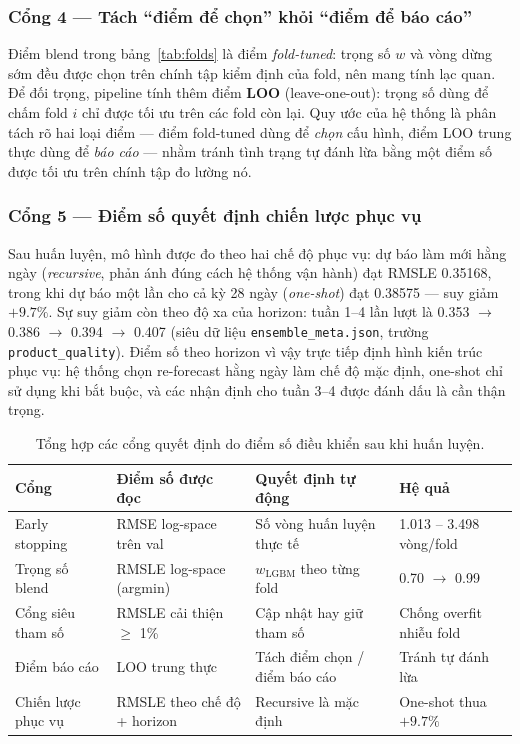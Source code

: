 \documentclass[12pt,a4paper]{report}
\begin{document}
\subsubsection{Cổng 4 --- Tách ``điểm để chọn'' khỏi ``điểm để báo cáo''}
Điểm blend trong bảng~\ref{tab:folds} là điểm \emph{fold-tuned}: trọng số $w$ và vòng
dừng sớm đều được chọn trên chính tập kiểm định của fold, nên mang tính lạc quan. Để
đối trọng, pipeline tính thêm điểm \textbf{LOO} (leave-one-out): trọng số dùng để chấm
fold $i$ chỉ được tối ưu trên các fold còn lại. Quy ước của hệ thống là phân tách rõ
hai loại điểm --- điểm fold-tuned dùng để \emph{chọn} cấu hình, điểm LOO trung thực
dùng để \emph{báo cáo} --- nhằm tránh tình trạng tự đánh lừa bằng một điểm số được tối
ưu trên chính tập đo lường nó.

\subsubsection{Cổng 5 --- Điểm số quyết định chiến lược phục vụ}
Sau huấn luyện, mô hình được đo theo hai chế độ phục vụ: dự báo làm mới hằng ngày
(\emph{recursive}, phản ánh đúng cách hệ thống vận hành) đạt RMSLE 0.35168, trong khi
dự báo một lần cho cả kỳ 28 ngày (\emph{one-shot}) đạt 0.38575 --- suy giảm $+9.7\%$.
Sự suy giảm còn theo độ xa của horizon: tuần 1--4 lần lượt là 0.353 $\rightarrow$ 0.386
$\rightarrow$ 0.394 $\rightarrow$ 0.407 (siêu dữ liệu \texttt{ensemble\_meta.json},
trường \texttt{product\_quality}). Điểm số theo horizon vì vậy trực tiếp định hình kiến
trúc phục vụ: hệ thống chọn re-forecast hằng ngày làm chế độ mặc định, one-shot chỉ sử
dụng khi bắt buộc, và các nhận định cho tuần 3--4 được đánh dấu là cần thận trọng.

\begin{table}[H]
\centering
\small
\begin{tabular}{@{}llll@{}}
\toprule
\textbf{Cổng} & \textbf{Điểm số được đọc} & \textbf{Quyết định tự động} & \textbf{Hệ quả} \\
\midrule
Early stopping & RMSE log-space trên val & Số vòng huấn luyện thực tế & 1.013 -- 3.498 vòng/fold \\
Trọng số blend & RMSLE log-space (argmin) & $w_{\mathrm{LGBM}}$ theo từng fold & 0.70 $\rightarrow$ 0.99 \\
Cổng siêu tham số & RMSLE cải thiện $\geq$ 1\% & Cập nhật hay giữ tham số & Chống overfit nhiễu fold \\
Điểm báo cáo & LOO trung thực & Tách điểm chọn / điểm báo cáo & Tránh tự đánh lừa \\
Chiến lược phục vụ & RMSLE theo chế độ + horizon & Recursive là mặc định & One-shot thua $+9.7\%$ \\
\bottomrule
\end{tabular}
\caption{Tổng hợp các cổng quyết định do điểm số điều khiển sau khi huấn luyện.}
\label{tab:scoregates}
\end{table}
\end{document}
